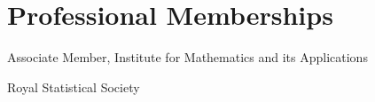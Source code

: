 \documentclass[letterpaper,11pt]{article}
\begin{document}
\section{Professional Memberships}
\begin{itemize}[leftmargin=0.15in, label={}]
    \small{\item{Associate Member, Institute for Mathematics and its Applications} \\
           \item{Royal Statistical Society}}
\end{itemize}


\end{document}
